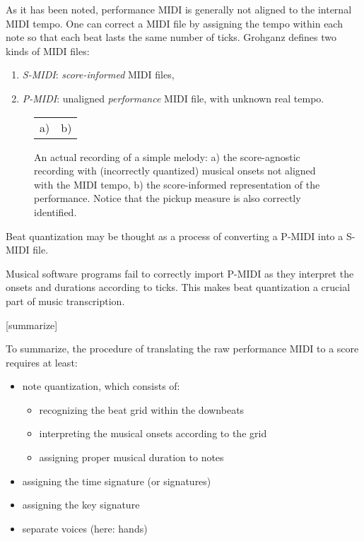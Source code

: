 As it has been noted, performance MIDI is generally not aligned to the internal MIDI tempo. One can correct a MIDI file by assigning the tempo within each note so that each beat lasts the same number of ticks. Grohganz \cite{Grohganz2014} defines two kinds of MIDI files: \begin{enumerate}
	\item \emph{S-MIDI}: \emph{score-informed} MIDI files,
	\item \emph{P-MIDI}: unaligned \emph{performance} MIDI file, with unknown real tempo.
\end{enumerate}

\begin{figure}[ht!]
\centering
\begin{tabular}{cc}a)

 & b)
\end{tabular}
\caption{An actual recording of a simple melody: a) the score-agnostic recording with (incorrectly quantized) musical onsets not aligned with the MIDI tempo, b) the score-informed representation of the performance. Notice that the pickup measure is also correctly identified.}
\label{score_informed}
\end{figure}

Beat quantization may be thought as a process of converting a P-MIDI into a S-MIDI file.

Musical software programs fail to correctly import P-MIDI as they interpret the onsets and durations according to ticks. This makes beat quantization a crucial part of music transcription.

[summarize]

To summarize, the procedure of translating the raw performance MIDI to a score requires at least: \begin{itemize}
	\item note quantization, which consists of:
	\begin{itemize}
		\item recognizing the beat grid within the downbeats
		\item interpreting the musical onsets according to the grid
		\item assigning proper musical duration to notes	
	\end{itemize}
	\item assigning the time signature (or signatures)
	\item assigning the key signature
	\item separate voices (here: hands)
\end{itemize}


